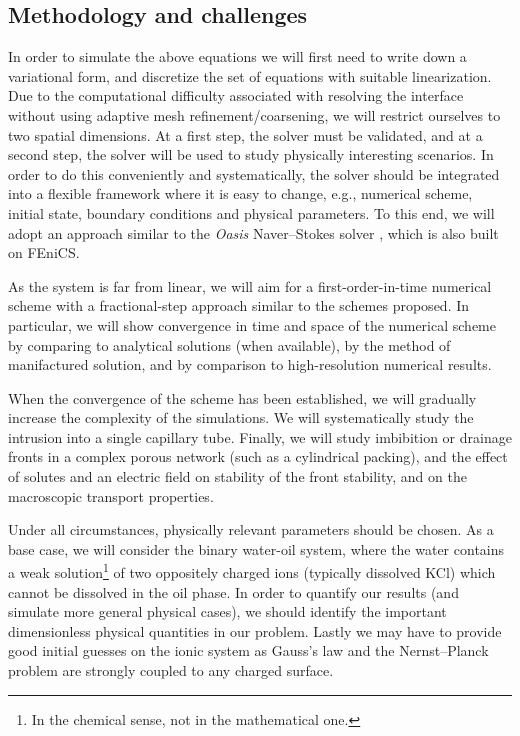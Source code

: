 \documentclass[a4paper,10pt]{article}
\begin{document}
\subsection*{Methodology and challenges}
In order to simulate the above equations we will first need to write down a variational form, and discretize the set of equations with suitable linearization.
Due to the computational difficulty associated with resolving the interface without using adaptive mesh refinement/coarsening, we will restrict ourselves to two spatial dimensions.
At a first step, the solver must be validated, and at a second step, the solver will be used to study physically interesting scenarios.
In order to do this conveniently and systematically, the solver should be integrated into a flexible framework where it is easy to change, e.g., numerical scheme, initial state, boundary conditions and physical parameters.
To this end, we will adopt an approach similar to the \emph{Oasis} Naver--Stokes solver \cite{mortensen2015}, which is also built on FEniCS.

As the system is far from linear, we will aim for a first-order-in-time numerical scheme with a fractional-step approach similar to the schemes proposed.
In particular, we will show convergence in time and space of the numerical scheme by comparing to analytical solutions (when available), by the method of manifactured solution, and by comparison to high-resolution numerical results.

When the convergence of the scheme has been established, we will gradually increase the complexity of the simulations.
We will systematically study the intrusion into a single capillary tube.
Finally, we will study imbibition or drainage fronts in a complex porous network (such as a cylindrical packing), and the effect of solutes and an electric field on stability of the front stability, and on the macroscopic transport properties.

Under all circumstances, physically relevant parameters should be chosen.
As a base case, we will consider the binary water-oil system, where the water contains a weak solution\footnote{In the chemical sense, not in the mathematical one.} of two oppositely charged ions (typically dissolved KCl) which cannot be dissolved in the oil phase.
In order to quantify our results (and simulate more general physical cases), we should identify the important dimensionless physical quantities in our problem.
Lastly we may have to provide good initial guesses on the ionic system as Gauss's law and the Nernst--Planck problem are strongly coupled to any charged surface.
\end{document}
